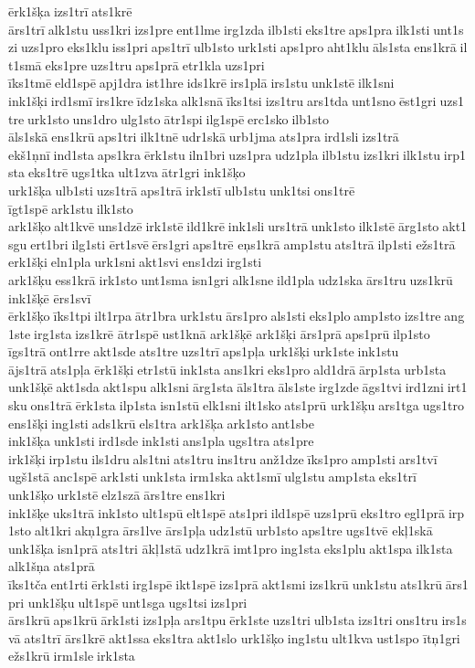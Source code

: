 ērk1šķa izs1trī ats1krē 	ārs1trī alk1stu uss1kri izs1pre ent1lme irg1zda ilb1sti eks1tre aps1pra ilk1sti unt1szi uzs1pro eks1klu iss1pri aps1trī ulb1sto urk1sti aps1pro aht1klu āls1sta ens1krā ilt1smā eks1pre uzs1tru aps1prā etr1kla uzs1pri 	īks1tmē eld1spē apj1dra ist1hre ids1krē irs1plā irs1stu unk1stē ilk1sni 	ink1šķi ird1smī irs1kre īdz1ska alk1snā īks1tsi izs1tru ars1tda unt1sno ēst1gri uzs1tre urk1sto uns1dro ulg1sto ātr1spi ilg1spē erc1sko ilb1sto 	āls1skā ens1krū aps1tri ilk1tnē udr1skā urb1jma ats1pra ird1sli izs1trā 
ekš1ņnī ind1sta aps1kra ērk1stu iln1bri uzs1pra udz1pla ilb1stu izs1kri ilk1stu irp1sta eks1trē ugs1tka ult1zva ātr1gri 	ink1šķo 	urk1šķa ulb1sti uzs1trā aps1trā irk1stī ulb1stu unk1tsi ons1trē 	īgt1spē ark1stu ilk1sto 	ark1šķo alt1kvē uns1dzē irk1stē ild1krē ink1sli urs1trā unk1sto ilk1stē ārg1sto akt1sgu ert1bri ilg1sti 	ērt1svē ērs1gri aps1trē 	eņs1krā amp1stu ats1trā ilp1sti 	ežs1trā 	erk1šķi eln1pla urk1sni akt1svi ens1dzi irg1sti 	ark1šķu ess1krā irk1sto unt1sma isn1gri alk1sne ild1pla udz1ska ārs1tru uzs1krū 
ink1šķē 	ērs1svī 
ērk1šķo īks1tpi ilt1rpa ātr1bra urk1stu ārs1pro als1sti eks1plo amp1sto izs1tre ang1ste irg1sta izs1krē 	ātr1spē ust1knā 
ark1šķē 	ark1šķi 	ārs1prā aps1prū ilp1sto 	īgs1trā ont1rre akt1sde ats1tre uzs1trī aps1pļa 	urk1šķi urk1ste ink1stu 	ājs1trā ats1pļa 
ērk1šķi etr1stū ink1sta ans1kri eks1pro ald1drā ārp1sta urb1sta 
unk1šķē akt1sda akt1spu alk1sni ārg1sta āls1tra āls1ste irg1zde āgs1tvi ird1zni irt1sku ons1trā ērk1sta ilp1sta isn1stū elk1sni ilt1sko ats1prū 	urk1šķu ars1tga ugs1tro 	ens1šķi ing1sti ads1krū els1tra 	ark1šķa ark1sto ant1sbe 	ink1šķa unk1sti ird1sde ink1sti ans1pla ugs1tra ats1pre 	irk1šķi irp1stu ils1dru als1tni ats1tru ins1tru anž1dze īks1pro amp1sti ars1tvī 	ugš1stā anc1spē ark1sti unk1sta irm1ska akt1smī ulg1stu amp1sta eks1trī 	unk1šķo urk1stē elz1szā ārs1tre ens1kri 	ink1šķe uks1trā ink1sto ult1spū elt1spē ats1pri ild1spē uzs1prū eks1tro egl1prā irp1sto alt1kri akņ1gra ārs1lve 	ārs1pļa udz1stū urb1sto aps1tre ugs1tvē 	ekļ1skā 	unk1šķa isn1prā ats1tri 
ākļ1stā udz1krā imt1pro ing1sta eks1plu akt1spa ilk1sta 	alk1šņa ats1prā 	īks1tča ent1rti ērk1sti irg1spē ikt1spē izs1prā akt1smi izs1krū unk1stu ats1krū ārs1pri 	unk1šķu ult1spē unt1sga ugs1tsi izs1pri 	ārs1krū aps1krū ārk1sti izs1pļa ars1tpu ērk1ste uzs1tri ulb1sta izs1tri ons1tru irs1svā ats1trī 	ārs1krē akt1ssa eks1tra akt1slo 	urk1šķo ing1stu ult1kva ust1spo 	ītņ1gri 	ežs1krū irm1sle irk1sta 
